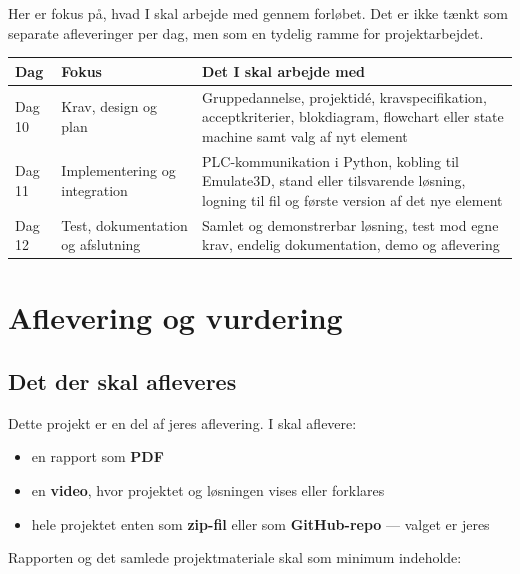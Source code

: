 \documentclass[12pt, a4paper]{article}
\begin{document}
Her er fokus på, hvad I skal arbejde med gennem forløbet. Det er ikke tænkt som
separate afleveringer per dag, men som en tydelig ramme for projektarbejdet.

\begin{tabularx}{\textwidth}{lXX}
\toprule
\textbf{Dag} & \textbf{Fokus} & \textbf{Det I skal arbejde med} \\
\midrule
Dag 10 & Krav, design og plan & Gruppedannelse, projektidé, kravspecifikation, acceptkriterier, blokdiagram, flowchart eller state machine samt valg af nyt element \\[6pt]

Dag 11 & Implementering og integration & PLC-kommunikation i Python, kobling til Emulate3D, stand eller tilsvarende løsning, logning til fil og første version af det nye element \\[6pt]

Dag 12 & Test, dokumentation og afslutning & Samlet og demonstrerbar løsning, test mod egne krav, endelig dokumentation, demo og aflevering \\
\bottomrule
\end{tabularx}
\clearpage
\section{Aflevering og vurdering}

\subsection{Det der skal afleveres}

Dette projekt er en del af jeres aflevering. I skal aflevere:

\begin{itemize}[leftmargin=1.2em, itemsep=2pt]
  \item en rapport som \textbf{PDF}
  \item en \textbf{video}, hvor projektet og løsningen vises eller forklares
  \item hele projektet enten som \textbf{zip-fil} eller som \textbf{GitHub-repo} --- valget er jeres
\end{itemize}

Rapporten og det samlede projektmateriale skal som minimum indeholde:
\end{document}
